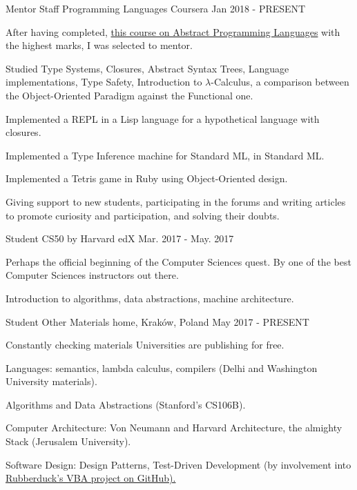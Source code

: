\begin{cventries}
  \cventry
    {Mentor Staff}
    {Programming Languages}
    {Coursera}
    {Jan 2018 - PRESENT}
    {
      \begin{cvitems} %
        \item {After having completed, \href{https://www.coursera.org/learn/programming-languages}{this course on Abstract Programming Languages} with the highest marks, I was selected to mentor.}
        \item {Studied Type Systems, Closures, Abstract Syntax Trees, Language implementations, Type Safety, Introduction to $\lambda$-Calculus, a comparison between the Object-Oriented Paradigm against the Functional one.}
        \item {Implemented a REPL in a Lisp language for a hypothetical language with closures.}
        \item {Implemented a Type Inference machine for Standard ML, in Standard ML.}
        \item {Implemented a Tetris game in Ruby using Object-Oriented design.}
        \item {Giving support to new students, participating in the forums and writing articles to promote curiosity and participation, and solving their doubts.}
      \end{cvitems}
    }

  \cventry
    {Student}
    {CS50 by Harvard}
    {edX}
	{Mar. 2017 - May. 2017} %
    {
		\begin{cvitems} %
			\item {Perhaps the official beginning of the Computer Sciences quest. By one of the best Computer Sciences instructors out there.}
			\item {Introduction to algorithms, data abstractions, machine architecture.}
		\end{cvitems}
    }

\cventry
	{Student}
	{Other Materials}
	{home, Kraków, Poland}
	{May 2017 - PRESENT}
	{
		\begin{cvitems} %
			\item {Constantly checking materials Universities are publishing for free.}
			\item {Languages: semantics, lambda calculus, compilers (Delhi and Washington University materials).}
			\item {Algorithms and Data Abstractions (Stanford's CS106B).}
			\item {Computer Architecture: Von Neumann and Harvard Architecture, the almighty Stack (Jerusalem University).}
			\item {Software Design: Design Patterns, Test-Driven Development (by involvement into \href{https://github.com/rubberduck-vba/Rubberduck}{Rubberduck's VBA project on GitHub).}}
		\end{cvitems}
	}

\end{cventries}
